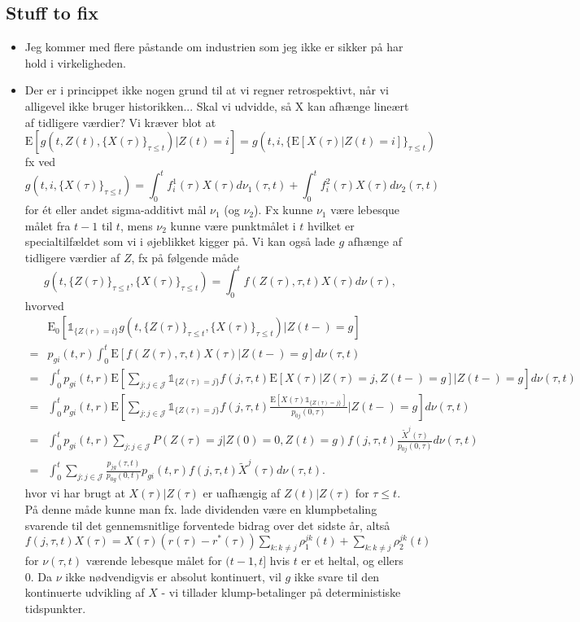\documentclass[12pt]{article}
\newcommand{\E}{\text{E}}
\newcommand{\indic}[1]{\mathds{1}_{ \{ #1 \} }}
\theoremstyle{my_thm}
\begin{document}
\subsection*{Stuff to fix}
\begin{itemize}
\item Jeg kommer med flere påstande om industrien som jeg ikke er sikker på har hold i virkeligheden.
\item Der er i princippet ikke nogen grund til at vi regner retrospektivt, når vi alligevel ikke bruger historikken... Skal vi udvidde, så X kan afhænge lineært af tidligere værdier? Vi kræver blot at
$$
\E[g(t,Z(t),\{ X(\tau) \}_{\tau\leq t})|Z(t)=i]=g(t,i,\{ \E[X(\tau)|Z(t)=i] \}_{\tau \leq t})$$
fx ved
$$
g(t,i,\{X(\tau)\}_{\tau \leq t})=\int_0^t f^1_i(\tau) X(\tau) d\nu_1(\tau,t) + \int_0^t f^2_i(\tau) X(\tau) d\nu_2(\tau,t)
$$
for ét eller andet sigma-additivt mål $\nu_1$ (og $\nu_2$). Fx kunne $\nu_1$ være lebesque målet fra $t-1$ til $t$, mens $\nu_2$ kunne være punktmålet i $t$ hvilket er specialtilfældet som vi i øjeblikket kigger på. Vi kan også lade $g$ afhænge af tidligere værdier af $Z$, fx på følgende måde
$$
g(t,\{Z(\tau)\}_{\tau\leq t},\{X(\tau)\}_{\tau\leq t})=
\int_0^t f(Z(\tau),\tau,t) X(\tau) d\nu(\tau),
$$
hvorved
\begin{align*}
&\E_0[\indic{Z(r)=i}g(t,\{Z(\tau)\}_{\tau\leq t},\{X(\tau)\}_{\tau\leq t})|Z(t-)=g]
\\
=&
p_{gi}(t,r)\int_0^t \E[ f(Z(\tau),\tau,t) X(\tau)|Z(t-)=g] d\nu(\tau,t)
\\
=&
\int_0^t p_{gi}(t,r) \E \left[ \sum_{j:j \in \mathcal{J}}  \indic{Z(\tau)=j} f(j,\tau,t) \E[X(\tau)|Z(\tau)=j,Z(t-)=g] \bigg| Z(t-)=g \right] d\nu(\tau,t)
\\
=&
\int_0^t p_{gi}(t,r) \E \left[ \sum_{j:j \in \mathcal{J}}  \indic{Z(\tau)=j} f(j,\tau,t) \frac{\E[X(\tau)\indic{Z(\tau)=j}]}{p_{0j}(0,\tau)} \bigg| Z(t-)=g \right] d\nu(\tau,t)
\\
=&
\int_0^t p_{gi}(t,r) \sum_{j:j \in \mathcal{J}}  P(Z(\tau)=j|Z(0)=0,Z(t)=g) f(j,\tau,t) \frac{\tilde{X}^j(\tau)}{p_{0j}(0,\tau)}  d\nu(\tau,t)
\\
=&
\int_0^t \sum_{j:j \in \mathcal{J}} \frac{p_{jg}(\tau,t)}{p_{0g}(0,t)} p_{gi}(t,r) f(j,\tau,t) \tilde{X}^j(\tau) d\nu(\tau,t).
\end{align*}
hvor vi har brugt at $X(\tau)|Z(\tau)$ er uafhængig af $Z(t)|Z(\tau)$ for $\tau\leq t$. På denne måde kunne man fx. lade dividenden være en klumpbetaling svarende til det gennemsnitlige forventede bidrag over det sidste år, altså $f(j,\tau,t)X(\tau)=X(\tau)(r(\tau)-r^*(\tau))\sum_{k:k\neq j} \rho_1^{jk}(t)+\sum_{k:k\neq j} \rho_2^{jk}(t)$ for $\nu(\tau,t)$ værende lebesque målet for $(t-1,t]$ hvis $t$ er et heltal, og ellers 0. Da $\nu$ ikke nødvendigvis er absolut kontinuert, vil $g$ ikke svare til den kontinuerte udvikling af $X$ - vi tillader klump-betalinger på deterministiske tidspunkter.

\end{itemize}
\end{document}
